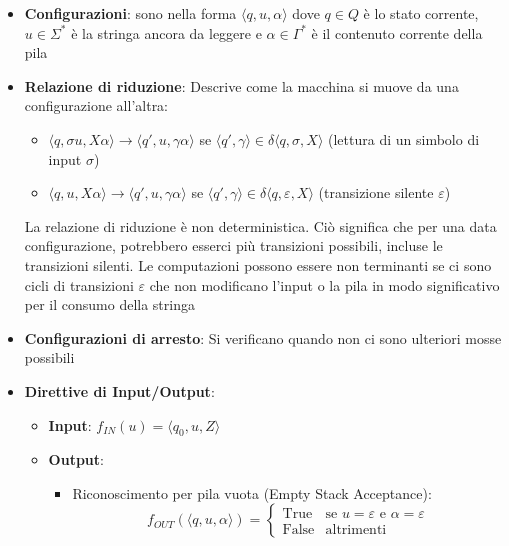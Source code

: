 \documentclass[12pt, a4paper]{report}
\begin{document}
            \begin{itemize}
                \item \textbf{Configurazioni}: sono nella forma $\langle q,u,\alpha\rangle$ dove $q\in Q$ è lo stato corrente, $u\in\Sigma^*$ è la stringa ancora da leggere e $\alpha\in\Gamma^*$ è il contenuto corrente della pila
                \item \textbf{Relazione di riduzione}: Descrive come la macchina si muove da una configurazione all'altra: \begin{itemize}
                    \item $\langle q, \sigma u, X \alpha \rangle \rightarrow \langle q', u, \gamma \alpha \rangle$ se $\langle q', \gamma \rangle \in \delta \langle q, \sigma, X \rangle$ (lettura di un simbolo di input $\sigma$)
                    \item $\langle q, u, X \alpha \rangle \rightarrow \langle q', u, \gamma \alpha \rangle$ se $\langle q', \gamma \rangle \in \delta \langle q, \varepsilon, X \rangle$ (transizione silente $\varepsilon$)
                \end{itemize}
                La relazione di riduzione è non deterministica. Ciò significa che per una data configurazione, potrebbero esserci più transizioni possibili, incluse le transizioni silenti. Le computazioni possono essere non terminanti se ci sono cicli di transizioni $\varepsilon$ che non modificano l'input o la pila in modo significativo per il consumo della stringa
                \item \textbf{Configurazioni di arresto}: Si verificano quando non ci sono ulteriori mosse possibili
                \item \textbf{Direttive di Input/Output}: \begin{itemize}
                    \item \textbf{Input}: $f_{IN}(u)=\langle q_0, u, Z \rangle$
                    \item \textbf{Output}: \begin{itemize}
                        \item Riconoscimento per pila vuota (Empty Stack Acceptance): \begin{equation*}
                            f_{OUT}(\langle q, u, \alpha \rangle)= \begin{cases} \text{True} & \text{se } u = \varepsilon \text{ e } \alpha = \varepsilon \\ \text{False} & \text{altrimenti} \end{cases}

\end{equation*}
\end{itemize}
\end{itemize}
\end{itemize}
\end{document}
